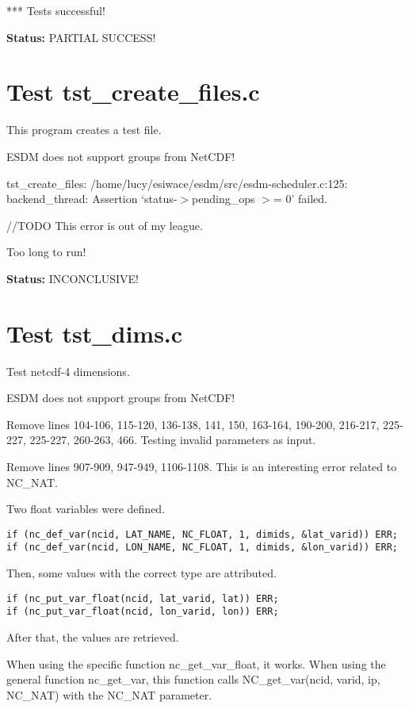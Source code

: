 *** Tests successful!

{\bf \large Status: } PARTIAL SUCCESS!

\section{Test tst\_create\_files.c}

This program creates a test file.

ESDM does not support groups from NetCDF!

tst\_create\_files: /home/lucy/esiwace/esdm/src/esdm-scheduler.c:125: backend\_thread: Assertion `status-$>$pending\_ops $>$= 0' failed.

//TODO This error is out of my league.

Too long to run!

{\bf \large Status: } INCONCLUSIVE!

\section{Test tst\_dims.c}

Test netcdf-4 dimensions.

ESDM does not support groups from NetCDF!

Remove lines 104-106, 115-120, 136-138, 141, 150, 163-164, 190-200, 216-217, 225-227, 225-227, 260-263, 466. Testing invalid parameters as input.

Remove lines 907-909, 947-949, 1106-1108. This is an interesting error related to NC\_NAT.

Two float variables were defined.

\begin{verbatim}
if (nc_def_var(ncid, LAT_NAME, NC_FLOAT, 1, dimids, &lat_varid)) ERR;
if (nc_def_var(ncid, LON_NAME, NC_FLOAT, 1, dimids, &lon_varid)) ERR;
\end{verbatim}

Then, some values with the correct type are attributed.

\begin{verbatim}
if (nc_put_var_float(ncid, lat_varid, lat)) ERR;
if (nc_put_var_float(ncid, lon_varid, lon)) ERR;
\end{verbatim}

After that, the values are retrieved.

When using the specific function nc\_get\_var\_float, it works. When using the general function nc\_get\_var, this function calls NC\_get\_var(ncid, varid, ip, NC\_NAT) with the NC\_NAT parameter.

